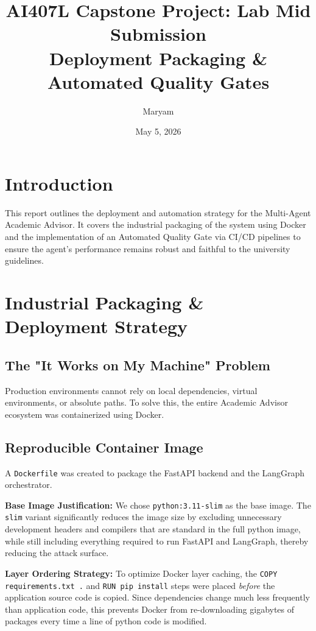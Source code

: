 \documentclass[12pt, a4paper]{article}
\title{\textbf{AI407L Capstone Project: Lab Mid Submission} \\ \large Deployment Packaging \& Automated Quality Gates}
\author{Maryam}
\date{May 5, 2026}
\begin{document}
\maketitle
\tableofcontents
\newpage

\section{Introduction}
This report outlines the deployment and automation strategy for the Multi-Agent Academic Advisor. It covers the industrial packaging of the system using Docker and the implementation of an Automated Quality Gate via CI/CD pipelines to ensure the agent's performance remains robust and faithful to the university guidelines.

\section{Industrial Packaging \& Deployment Strategy}

\subsection{The "It Works on My Machine" Problem}
Production environments cannot rely on local dependencies, virtual environments, or absolute paths. To solve this, the entire Academic Advisor ecosystem was containerized using Docker.

\subsection{Reproducible Container Image}
A \texttt{Dockerfile} was created to package the FastAPI backend and the LangGraph orchestrator. 

\textbf{Base Image Justification:} 
We chose \texttt{python:3.11-slim} as the base image. The \texttt{slim} variant significantly reduces the image size by excluding unnecessary development headers and compilers that are standard in the full python image, while still including everything required to run FastAPI and LangGraph, thereby reducing the attack surface.

\textbf{Layer Ordering Strategy:}
To optimize Docker layer caching, the \texttt{COPY requirements.txt .} and \texttt{RUN pip install} steps were placed \textit{before} the application source code is copied. Since dependencies change much less frequently than application code, this prevents Docker from re-downloading gigabytes of packages every time a line of python code is modified.
\end{document}
